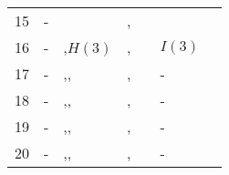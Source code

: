 \documentclass[a4paper, 11pt]{article}
\begin{document}
\begin{figure}[h]
\begin{tabular}{r|l|l|l|l|l|l}
        15     & -                             & \color{brilliantrose}{$G(4)$}                                                           & \color{brightlavender}{$B(3)$},\color{blue}{$A(3)$}  & \color{fulvous}{$E(17)$}        & \color{canaryyellow}{$H(3)$}                         & \color{brilliantrose}{$G(4)$}       \\
        16     & -                             & \color{brilliantrose}{$G(3)$},{$H(3)$}                                                  & \color{brightlavender}{$B(3)$},\color{blue}{$A(3)$}  & \color{fulvous}{$E(17)$}        & {$I(3)$}                                             & \color{brilliantrose}{$G(3)$}       \\
        17     & -                             & \color{canaryyellow}{$H(3)$},\color{brilliantrose}{$G(2)$},\color[rgb]{0,0,0}{$I(3)$}   & \color{brightlavender}{$B(3)$},\color{blue}{$A(3)$}  & \color{fulvous}{$E(17)$}        & -                                                    & \color{canaryyellow}{$H(3)$}              \\
        18     & -                             & \color{canaryyellow}{$H(2)$},\color{brilliantrose}{$G(2)$},\color[rgb]{0,0,0}{$I(3)$}   & \color{brightlavender}{$B(3)$},\color{blue}{$A(3)$}  & \color{fulvous}{$E(17)$}        & -                                                    & \color{canaryyellow}{$H(2)$}   \\
        19     & -                             & \color{cyan}{$G(2)$},\color[rgb]{0,0,0}{$I(3)$},\color{canaryyellow}{$H(1)$}            & \color{brightlavender}{$B(3)$},\color{blue}{$A(3)$}  & \color{fulvous}{$E(17)$}        & -                                                    & \color{brilliantrose}{$G(2)$}              \\
        20     & -                             & \color{cyan}{$G(1)$},\color[rgb]{0,0,0}{$I(3)$},\color{canaryyellow}{$H(1)$}            & \color{brightlavender}{$B(3)$},\color{blue}{$A(3)$}  & \color{fulvous}{$E(17)$}        & -                                                    & \color{brilliantrose}{$G(1)$}   \\
      \end{tabular}
      \label{}
    \end{figure} 
\end{document}
